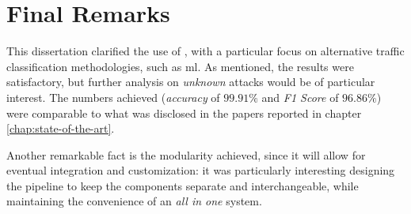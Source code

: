 \section{Final Remarks}
\label{sec:final-remarks}

This dissertation clarified the use of , with a particular focus on alternative traffic classification methodologies, such as \gls{ml}. As mentioned, the results were satisfactory, but further analysis on \textit{unknown} attacks would be of particular interest. The numbers achieved (\textit{accuracy} of $99.91\%$ and \textit{F1 Score} of $96.86\%$) were comparable to what was disclosed in the papers reported in chapter \ref{chap:state-of-the-art}.
\par Another remarkable fact is the modularity achieved, since it will allow for eventual integration and customization: it was particularly interesting designing the pipeline to keep the components separate and 
interchangeable, while maintaining the convenience of an \textit{all in one} system.